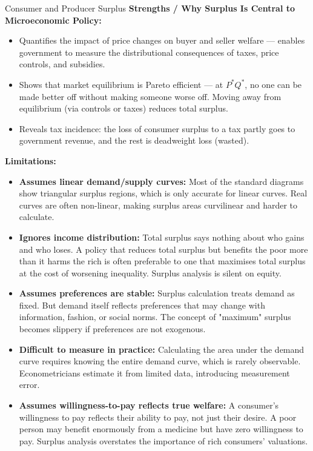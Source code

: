 \documentclass[11pt, a4paper, twoside]{book}
\begin{document}
\begin{evaluation}{Consumer and Producer Surplus}
\textbf{Strengths / Why Surplus Is Central to Microeconomic Policy:}
\begin{itemize}[leftmargin=*, nosep]
\item Quantifies the impact of price changes on buyer and seller welfare — enables government to measure the distributional consequences of taxes, price controls, and subsidies.
\item Shows that market equilibrium is Pareto efficient — at $P^*Q^*$, no one can be made better off without making someone worse off. Moving away from equilibrium (via controls or taxes) reduces total surplus.
\item Reveals tax incidence: the loss of consumer surplus to a tax partly goes to government revenue, and the rest is deadweight loss (wasted).
\end{itemize}

\textbf{Limitations:}
\begin{itemize}[leftmargin=*, nosep]
\item \textbf{Assumes linear demand/supply curves:} Most of the standard diagrams show triangular surplus regions, which is only accurate for linear curves. Real curves are often non-linear, making surplus areas curvilinear and harder to calculate.
\item \textbf{Ignores income distribution:} Total surplus says nothing about who gains and who loses. A policy that reduces total surplus but benefits the poor more than it harms the rich is often preferable to one that maximises total surplus at the cost of worsening inequality. Surplus analysis is silent on equity.
\item \textbf{Assumes preferences are stable:} Surplus calculation treats demand as fixed. But demand itself reflects preferences that may change with information, fashion, or social norms. The concept of "maximum" surplus becomes slippery if preferences are not exogenous.
\item \textbf{Difficult to measure in practice:} Calculating the area under the demand curve requires knowing the entire demand curve, which is rarely observable. Econometricians estimate it from limited data, introducing measurement error.
\item \textbf{Assumes willingness-to-pay reflects true welfare:} A consumer's willingness to pay reflects their ability to pay, not just their desire. A poor person may benefit enormously from a medicine but have zero willingness to pay. Surplus analysis overstates the importance of rich consumers' valuations.
\end{itemize}


\end{evaluation}
\end{document}
